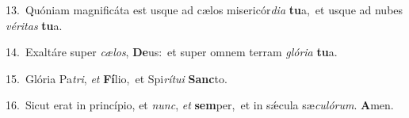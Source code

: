 {\numbfont\textcolor{\numbcolor}{13.}}~Quóniam magnificáta est usque ad cælos misericór\-\textit{di}\-\textit{a} \textbf{tu}\-a,~\star et usque ad nubes \textit{vé}\-\textit{ri}\textit{tas} \textbf{tu}\-a.\par
{\numbfont\textcolor{\numbcolor}{14.}}~Exaltáre super \textit{cæ}\-\textit{los}, \textbf{De}\-us:~\star et super omnem terram \textit{gló}\-\textit{ri}\textit{a} \textbf{tu}\-a.\par
{\numbfont\textcolor{\numbcolor}{15.}}~Glória Pa\-\textit{tri}\-, \textit{et} \textbf{Fí}\-lio,~\star et Spi\-\textit{rí}\-\textit{tu}\textit{i} \textbf{Sanc}\-to.\par
{\numbfont\textcolor{\numbcolor}{16.}}~Sicut erat in princípio, et \textit{nunc}\-, \textit{et} \textbf{sem}\-per,~\star et in sǽcula sæ\-\textit{cu}\-\textit{ló}\textit{rum}. \textbf{A}\-men.\par
